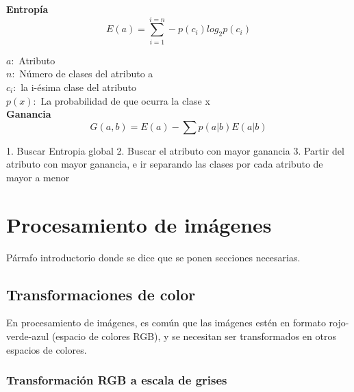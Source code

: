 \documentclass[twoside,spanish,ESP,MSc]{plantillaLabUPV}
\theoremstyle{definition}
\begin{document}
 \textbf{Entropía}\\
 
 $$E(a) = \sum_{i=1}^{i=n} -p(c_i) log_{2}p(c_i)$$
 
$a:$ Atributo\\
$n:$ Número de clases del atributo a\\
$c_i:$ la i-ésima clase del atributo \\
$p(x):$ La probabilidad de que ocurra la clase x\\
 
 \textbf{Ganancia}\\
 $$G(a,b)= E(a) - \sum p(a|b)E(a|b)$$

 1. Buscar Entropia global
 2. Buscar el atributo con mayor ganancia
 3. Partir del atributo con mayor ganancia, e ir separando las clases por cada atributo de mayor a menor



% 
% 




\section{Procesamiento de imágenes}
Párrafo introductorio donde se dice que se ponen secciones necesarias.


\subsection{Transformaciones de color}

En procesamiento de imágenes, es común que las imágenes estén en formato rojo-verde-azul (espacio de colores RGB), y se necesitan ser transformados en otros espacios de colores. 

\subsubsection{Transformación RGB a escala de grises}
\end{document}
